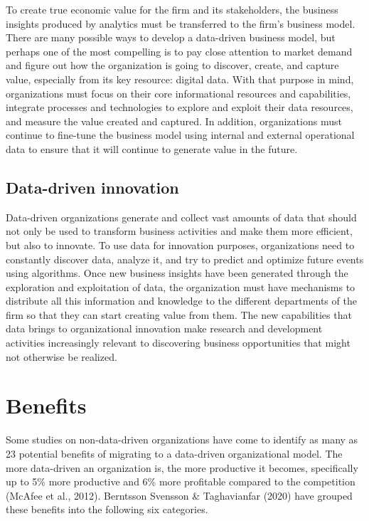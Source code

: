 \documentclass[
  letterpaper,
  DIV=11,
  numbers=noendperiod]{scrreprt}
\begin{document}
To create true economic value for the firm and its stakeholders, the
business insights produced by analytics must be transferred to the
firm's business model. There are many possible ways to develop a
data-driven business model, but perhaps one of the most compelling is to
pay close attention to market demand and figure out how the organization
is going to discover, create, and capture value, especially from its key
resource: digital data. With that purpose in mind, organizations must
focus on their core informational resources and capabilities, integrate
processes and technologies to explore and exploit their data resources,
and measure the value created and captured. In addition, organizations
must continue to fine-tune the business model using internal and
external operational data to ensure that it will continue to generate
value in the future.

\hypertarget{data-driven-innovation}{%
\subsection{Data-driven innovation}\label{data-driven-innovation}}

Data-driven organizations generate and collect vast amounts of data that
should not only be used to transform business activities and make them
more efficient, but also to innovate. To use data for innovation
purposes, organizations need to constantly discover data, analyze it,
and try to predict and optimize future events using algorithms. Once new
business insights have been generated through the exploration and
exploitation of data, the organization must have mechanisms to
distribute all this information and knowledge to the different
departments of the firm so that they can start creating value from them.
The new capabilities that data brings to organizational innovation make
research and development activities increasingly relevant to discovering
business opportunities that might not otherwise be realized.

\hypertarget{benefits}{%
\section{Benefits}\label{benefits}}

Some studies on non-data-driven organizations have come to identify as
many as 23 potential benefits of migrating to a data-driven
organizational model. The more data-driven an organization is, the more
productive it becomes, specifically up to 5\% more productive and 6\%
more profitable compared to the competition (McAfee et al., 2012).
Berntsson Svensson \& Taghavianfar (2020) have grouped these benefits
into the following six categories.
\end{document}
